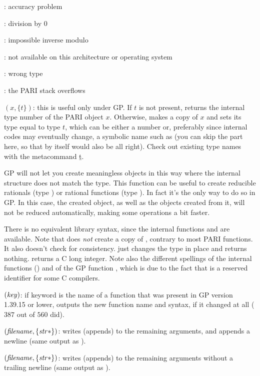 : accuracy problem

: division by 0

: impossible inverse modulo

: not available on this architecture or operating system

: wrong type

: the PARI stack overflows

$(x,\{t\})$: this is useful only under GP. If $t$ is
not present, returns the internal type number of the PARI object $x$.
Otherwise, makes a copy of $x$ and sets its type equal to type $t$, which
can be either a number or, preferably since internal codes may eventually
change, a symbolic name such as  (you can skip the \typ{}
part here, so that  by itself would also be all right). Check out
existing type names with the metacommand \b{t}.\label{se:gptype}

  GP will not let you create meaningless objects in this way where the internal
structure does not match the type. This function can be useful to create
reducible rationals (type ) or rational functions (type
). In fact it's the only way to do so in GP. In this case, the
created object, as well as the objects created from it, will not be reduced
automatically, making some operations a bit faster.

There is no equivalent library syntax, since the internal functions 
and  are available. Note that  does \emph{not}
create a copy of , contrary to most PARI functions. It also doesn't
check for consistency.  just changes the type in place and
returns nothing.  returns a C long integer. Note also the different
spellings of the internal functions () and of the GP
function , which is due to the fact that  is a reserved
identifier for some C compilers.

$(\hbox{\it key\/})$: if keyword  is the name
of a function that was present in GP version 1.39.15 or lower, outputs
the new function name and syntax, if it changed at all ($387$ out of $560$
did).\label{se:whatnow}

$(\hbox{\it filename\/},\{\hbox{\it str\/}*\})$: writes (appends)
to  the remaining arguments, and appends a newline (same output
as ).\label{se:write}

$(\hbox{\it filename\/},\{\hbox{\it str\/}*\})$: writes (appends) to
 the remaining arguments without a trailing newline
(same output as ).


